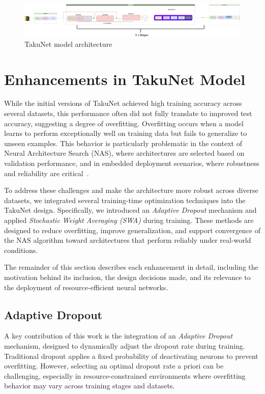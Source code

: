 \begin{figure}[ht]
    \centering
    \includegraphics[width=\linewidth]{Pictures/TakuNet.png}
    \caption{TakuNet model architecture}
    \label{fig:TakuNet}
\end{figure}





\section{Enhancements in TakuNet Model}


While the initial versions of TakuNet achieved high training accuracy across several datasets, this performance often did not fully translate to improved test accuracy, suggesting a degree of overfitting. Overfitting occurs when a model learns to perform exceptionally well on training data but fails to generalize to unseen examples. This behavior is particularly problematic in the context of Neural Architecture Search (NAS), where architectures are selected based on validation performance, and in embedded deployment scenarios, where robustness and reliability are critical~\cite{Goodfellow-et-al-2016}.


To address these challenges and make the architecture more robust across diverse datasets, we integrated several training-time optimization techniques into the TakuNet design. Specifically, we introduced an \textit{Adaptive Dropout} mechanism and applied \textit{Stochastic Weight Averaging (SWA)} during training. These methods are designed to reduce overfitting, improve generalization, and support convergence of the NAS algorithm toward architectures that perform reliably under real-world conditions.

The remainder of this section describes each enhancement in detail, including the motivation behind its inclusion, the design decisions made, and its relevance to the deployment of resource-efficient neural networks.


\subsection{Adaptive Dropout}

A key contribution of this work is the integration of an \textit{Adaptive Dropout} mechanism, designed to dynamically adjust the dropout rate during training. Traditional dropout applies a fixed probability of deactivating neurons to prevent overfitting. However, selecting an optimal dropout rate a priori can be challenging, especially in resource-constrained environments where overfitting behavior may vary across training stages and datasets.

